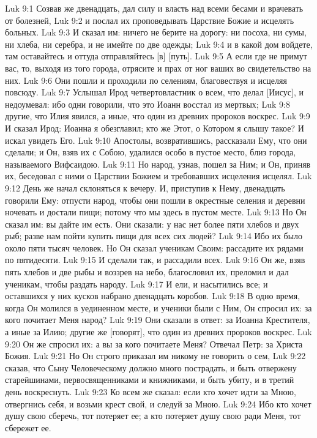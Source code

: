 Luk 9:1  Созвав же двенадцать, дал силу и власть над всеми бесами и врачевать от болезней,
Luk 9:2  и послал их проповедывать Царствие Божие и исцелять больных.
Luk 9:3  И сказал им: ничего не берите на дорогу: ни посоха, ни сумы, ни хлеба, ни серебра, и не имейте по две одежды;
Luk 9:4  и в какой дом войдете, там оставайтесь и оттуда отправляйтесь [в] [путь].
Luk 9:5  А если где не примут вас, то, выходя из того города, отрясите и прах от ног ваших во свидетельство на них.
Luk 9:6  Они пошли и проходили по селениям, благовествуя и исцеляя повсюду.
Luk 9:7  Услышал Ирод четвертовластник о всем, что делал [Иисус], и недоумевал: ибо одни говорили, что это Иоанн восстал из мертвых;
Luk 9:8  другие, что Илия явился, а иные, что один из древних пророков воскрес.
Luk 9:9  И сказал Ирод: Иоанна я обезглавил; кто же Этот, о Котором я слышу такое? И искал увидеть Его.
Luk 9:10  Апостолы, возвратившись, рассказали Ему, что они сделали; и Он, взяв их с Собою, удалился особо в пустое место, близ города, называемого Вифсаидою.
Luk 9:11  Но народ, узнав, пошел за Ним; и Он, приняв их, беседовал с ними о Царствии Божием и требовавших исцеления исцелял.
Luk 9:12  День же начал склоняться к вечеру. И, приступив к Нему, двенадцать говорили Ему: отпусти народ, чтобы они пошли в окрестные селения и деревни ночевать и достали пищи; потому что мы здесь в пустом месте.
Luk 9:13  Но Он сказал им: вы дайте им есть. Они сказали: у нас нет более пяти хлебов и двух рыб; разве нам пойти купить пищи для всех сих людей?
Luk 9:14  Ибо их было около пяти тысяч человек. Но Он сказал ученикам Своим: рассадите их рядами по пятидесяти.
Luk 9:15  И сделали так, и рассадили всех.
Luk 9:16  Он же, взяв пять хлебов и две рыбы и воззрев на небо, благословил их, преломил и дал ученикам, чтобы раздать народу.
Luk 9:17  И ели, и насытились все; и оставшихся у них кусков набрано двенадцать коробов.
Luk 9:18  В одно время, когда Он молился в уединенном месте, и ученики были с Ним, Он спросил их: за кого почитает Меня народ?
Luk 9:19  Они сказали в ответ: за Иоанна Крестителя, а иные за Илию; другие же [говорят], что один из древних пророков воскрес.
Luk 9:20  Он же спросил их: а вы за кого почитаете Меня? Отвечал Петр: за Христа Божия.
Luk 9:21  Но Он строго приказал им никому не говорить о сем,
Luk 9:22  сказав, что Сыну Человеческому должно много пострадать, и быть отвержену старейшинами, первосвященниками и книжниками, и быть убиту, и в третий день воскреснуть.
Luk 9:23  Ко всем же сказал: если кто хочет идти за Мною, отвергнись себя, и возьми крест свой, и следуй за Мною.
Luk 9:24  Ибо кто хочет душу свою сберечь, тот потеряет ее; а кто потеряет душу свою ради Меня, тот сбережет ее.
